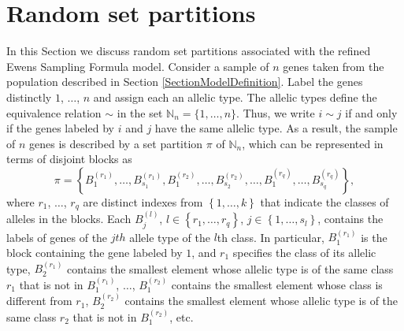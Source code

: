 \documentclass[12pt]{amsart}
\theoremstyle{definition}
\numberwithin{equation}{section}
\begin{document}
\section{Random set partitions}\label{SectionRandomSetPartitions}
In this Section we discuss random set partitions associated with
the refined Ewens Sampling Formula model. Consider a sample of $n$
genes taken from the population described in Section \ref{SectionModelDefinition}. Label the genes distinctly $1$, $\ldots$, $n$ and assign each an allelic type. The allelic types define
the equivalence relation $\sim$ in the set $\mathbb{N}_n=\{1,\ldots,n\}$.
Thus, we write $i\sim j$ if and only if the genes labeled by $i$ and $j$
have the same allelic type. As a result, the sample of $n$ genes is described by a set partition $\pi$ of $\mathbb{N}_n$, which can be represented in terms of disjoint blocks  as
\begin{equation}\label{3.7.0}
\pi=\left\{B_1^{(r_1)},\ldots,B_{s_1}^{(r_1)},
B_1^{(r_2)},\ldots,B_{s_2}^{(r_2)},\ldots,
B_1^{(r_q)},\ldots,B_{s_q}^{(r_q)}\right\},
\end{equation}
where $r_1$, $\ldots$, $r_q$ are distinct indexes from $\left\{1,\ldots,
k\right\}$ that indicate the classes of alleles in the blocks.
Each $B_j^{(l)}$, $l\in\left\{r_1,\ldots,r_q\right\}$, $j\in\left\{1,\ldots,s_l\right\}$, contains the labels of genes of the $jth$ allele type of the $l$th class. In particular, $B_1^{(r_1)}$ is the block containing the gene labeled by $1$, and $r_1$ specifies the class
of its allelic type, $B_2^{(r_1)}$ contains the smallest element whose allelic type is of the same class $r_1$ that is not in $B_1^{(r_1)}$,
$\ldots$, $B_1^{(r_2)}$ contains the smallest element whose class is different from $r_1$,
$B_2^{(r_2)}$ contains the smallest element whose allelic type is of the same class $r_2$ that is not in $B_1^{(r_2)}$, etc.
\end{document}
